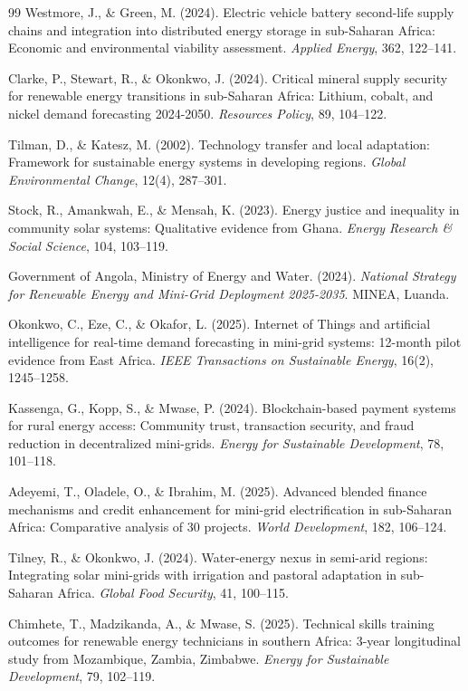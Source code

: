 \documentclass[12pt, a4paper]{article}
\begin{document}
\begin{thebibliography}{99}
 Westmore, J., \& Green, M. (2024). Electric vehicle battery second-life supply chains and integration into distributed energy storage in sub-Saharan Africa: Economic and environmental viability assessment. \textit{Applied Energy}, 362, 122--141.

 Clarke, P., Stewart, R., \& Okonkwo, J. (2024). Critical mineral supply security for renewable energy transitions in sub-Saharan Africa: Lithium, cobalt, and nickel demand forecasting 2024-2050. \textit{Resources Policy}, 89, 104--122.

 Tilman, D., \& Katesz, M. (2002). Technology transfer and local adaptation: Framework for sustainable energy systems in developing regions. \textit{Global Environmental Change}, 12(4), 287--301.

 Stock, R., Amankwah, E., \& Mensah, K. (2023). Energy justice and inequality in community solar systems: Qualitative evidence from Ghana. \textit{Energy Research \& Social Science}, 104, 103--119.

 Government of Angola, Ministry of Energy and Water. (2024). \textit{National Strategy for Renewable Energy and Mini-Grid Deployment 2025-2035}. MINEA, Luanda.

 Okonkwo, C., Eze, C., \& Okafor, L. (2025). Internet of Things and artificial intelligence for real-time demand forecasting in mini-grid systems: 12-month pilot evidence from East Africa. \textit{IEEE Transactions on Sustainable Energy}, 16(2), 1245--1258.

 Kassenga, G., Kopp, S., \& Mwase, P. (2024). Blockchain-based payment systems for rural energy access: Community trust, transaction security, and fraud reduction in decentralized mini-grids. \textit{Energy for Sustainable Development}, 78, 101--118.

 Adeyemi, T., Oladele, O., \& Ibrahim, M. (2025). Advanced blended finance mechanisms and credit enhancement for mini-grid electrification in sub-Saharan Africa: Comparative analysis of 30 projects. \textit{World Development}, 182, 106--124.

 Tilney, R., \& Okonkwo, J. (2024). Water-energy nexus in semi-arid regions: Integrating solar mini-grids with irrigation and pastoral adaptation in sub-Saharan Africa. \textit{Global Food Security}, 41, 100--115.

 Chimhete, T., Madzikanda, A., \& Mwase, S. (2025). Technical skills training outcomes for renewable energy technicians in southern Africa: 3-year longitudinal study from Mozambique, Zambia, Zimbabwe. \textit{Energy for Sustainable Development}, 79, 102--119.


\end{thebibliography}
\end{document}
